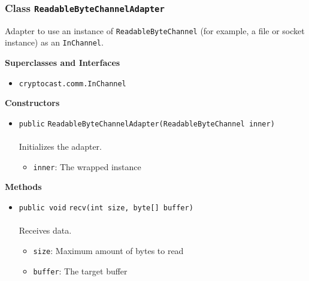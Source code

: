 \subsubsection{Class \lstinline|ReadableByteChannelAdapter|}
Adapter to use an instance of \lstinline|ReadableByteChannel| (for example, a file or socket instance) 
 as an \lstinline|InChannel|. \\
\noindent\begin{minipage}[t]{5cm}
\vspace{0.3em}
\hspace*{2em}
\vspace{0.3em}
\end{minipage}



\textbf{\sffamily Superclasses and Interfaces}
\begin{itemize}
\item \lstinline|cryptocast.comm.InChannel|
\end{itemize}


\textbf{\sffamily Constructors}
\begin{itemize}
\item \lstinline|public| \lstinline|ReadableByteChannelAdapter|\lstinline|(ReadableByteChannel inner)|\\ \\[-0.6em]
Initializes the adapter.
\begin{itemize}
\item \lstinline|inner|: The wrapped instance
\end{itemize}



\end{itemize}


\textbf{\sffamily Methods}
\begin{itemize}
\item \lstinline|public void| \lstinline|recv|\lstinline|(int size, byte[] buffer)|\\ \\[-0.6em]
Receives data.
\begin{itemize}
\item \lstinline|size|: Maximum amount of bytes to read
\item \lstinline|buffer|: The target buffer
\end{itemize}



\end{itemize}

